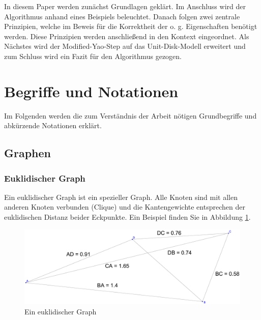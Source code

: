 \documentclass[a4paper,twoside]{IEEEtran}
\begin{document}
In diesem Paper werden zunächst Grundlagen geklärt.
Im Anschluss wird der Algorithmus anhand eines Beispiels beleuchtet.
Danach folgen zwei zentrale Prinzipien, welche im Beweis für die Korrektheit der o. g. Eigenschaften benötigt werden.
Diese Prinzipien werden anschließend in den Kontext eingeordnet.
Als Nächstes wird der Modified-Yao-Step auf das Unit-Disk-Modell erweitert und zum Schluss wird ein Fazit für den Algorithmus gezogen.




\section{Begriffe und Notationen}
Im Folgenden werden die zum Verständnis der Arbeit nötigen Grundbegriffe und abkürzende Notationen erklärt.




\subsection{Graphen}
\subsubsection{Euklidischer Graph}
Ein euklidischer Graph ist ein spezieller Graph. 
Alle Knoten sind mit allen anderen Knoten verbunden (Clique) und die Kantengewichte entsprechen der euklidischen Distanz beider Eckpunkte. 
Ein Beispiel finden Sie in Abbildung \ref{fig:Graph}.
\begin{figure}[h!]
\centering
\includegraphics[width=0.99\linewidth]{Graph.eps}
\caption{Ein euklidischer Graph}
\label{fig:Graph}
\end{figure}
\end{document}
